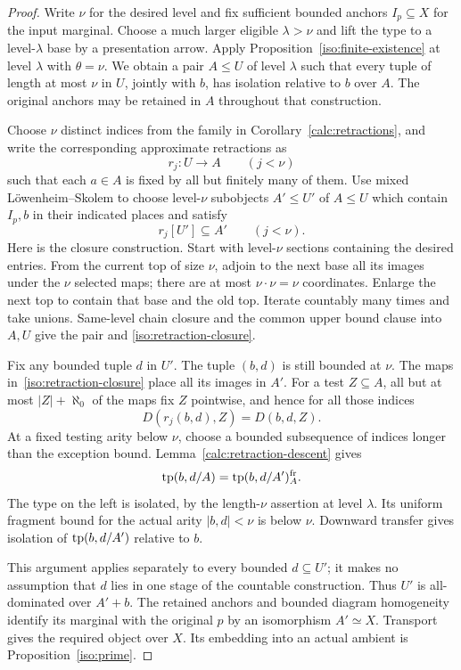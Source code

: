 \begin{proof}
Write $\nu$ for the desired level and fix sufficient bounded anchors
$I_p\subseteq X$ for the input marginal. Choose a much larger eligible
$\lambda>\nu$ and lift the type to a level-$\lambda$ base by a
presentation arrow. Apply Proposition~\ref{iso:finite-existence} at
level $\lambda$ with $\theta=\nu$. We obtain a pair $A\leq U$ of
level $\lambda$ such that every tuple of length at most $\nu$ in $U$,
jointly with $b$, has isolation relative to $b$ over $A$. The original
anchors may be retained in $A$ throughout that construction.

Choose $\nu$ distinct indices from the family in
Corollary~\ref{calc:retractions}, and write the corresponding
approximate retractions as
\[
 r_j:U\longrightarrow A\qquad(j<\nu)
\]
such that each $a\in A$ is fixed by all but finitely many of them.
Use mixed L\"owenheim--Skolem to choose level-$\nu$ subobjects
$A'\leq U'$ of $A\leq U$ which contain $I_p,b$ in their indicated
places and satisfy
\begin{equation}\label{iso:retraction-closure}
 r_j[U']\subseteq A'\qquad(j<\nu).
\end{equation}
Here is the closure construction. Start with level-$\nu$ sections
containing the desired entries. From the current top of size $\nu$,
adjoin to the next base all its images under the $\nu$ selected maps;
there are at most $\nu\cdot\nu=\nu$ coordinates. Enlarge the next
top to contain that base and the old top. Iterate countably many
times and take unions. Same-level chain closure and the common upper
bound clause into $A,U$ give the pair and
\eqref{iso:retraction-closure}.

Fix any bounded tuple $d$ in $U'$. The tuple $(b,d)$ is still bounded
at $\nu$. The maps in~\eqref{iso:retraction-closure} place all its
images in $A'$. For a test $Z\subseteq A$, all but at most
$|Z|+\aleph_0$ of the maps fix $Z$ pointwise, and hence for all those
indices
\[
 D(r_j(b,d),Z)=D(b,d,Z).
\]
At a fixed testing arity below $\nu$, choose a bounded subsequence of
indices longer than the exception bound. Lemma~\ref{calc:retraction-descent}
gives
\[
 \operatorname{tp}(b,d/A)=\operatorname{tp}(b,d/A')^{\mathrm{fr}}_A.
\]
The type on the left is isolated, by the length-$\nu$ assertion at
level $\lambda$. Its uniform fragment bound for the actual arity
$|b,d|<\nu$ is below $\nu$. Downward transfer gives isolation of
$\operatorname{tp}(b,d/A')$ relative to $b$.

This argument applies separately to every bounded $d\subseteq U'$;
it makes no assumption that $d$ lies in one stage of the countable
construction. Thus $U'$ is all-dominated over $A'+b$. The retained
anchors and bounded diagram homogeneity identify its marginal with
the original $p$ by an isomorphism $A'\simeq X$. Transport gives the
required object over $X$. Its embedding into an actual ambient is
Proposition~\ref{iso:prime}.
\end{proof}

